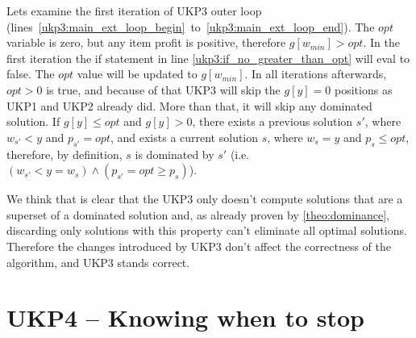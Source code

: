 \documentclass[12pt]{article}
\begin{document}
Lets examine the first iteration of UKP3 outer loop (lines~\ref{ukp3:main_ext_loop_begin}~to~\ref{ukp3:main_ext_loop_end}). The \(opt\) variable is zero, but any item profit is positive, therefore \(g[w_{min}] > opt\). In the first iteration the if statement in line \ref{ukp3:if_no_greater_than_opt} will eval to false. The \(opt\) value will be updated to \(g[w_{min}]\). In all iterations afterwards, \(opt > 0\) is true, and because of that UKP3 will skip the \(g[y] = 0\) positions as UKP1 and UKP2 already did. More than that, it will skip any dominated solution. If \(g[y] \leq opt\) and \(g[y] > 0\), there exists a previous solution \(s'\), where \(w_{s'} < y\) and \(p_{s'} = opt\), and exists a current solution \(s\), where \(w_s = y\) and \(p_s \leq opt\), therefore, by definition, \(s\) is dominated by \(s'\) (i.e. \((w_{s'} < y = w_s) \land (p_{s'} = opt \geq p_s)\)).

We think that is clear that the UKP3 only doesn't compute solutions that are a superset of a dominated solution and, as already proven by \autoref{theo:dominance}, discarding only solutions with this property can't eliminate all optimal solutions. Therefore the changes introduced by UKP3 don't affect the correctness of the algorithm, and UKP3 stands correct.

\section{UKP4 -- Knowing when to stop}
\end{document}
